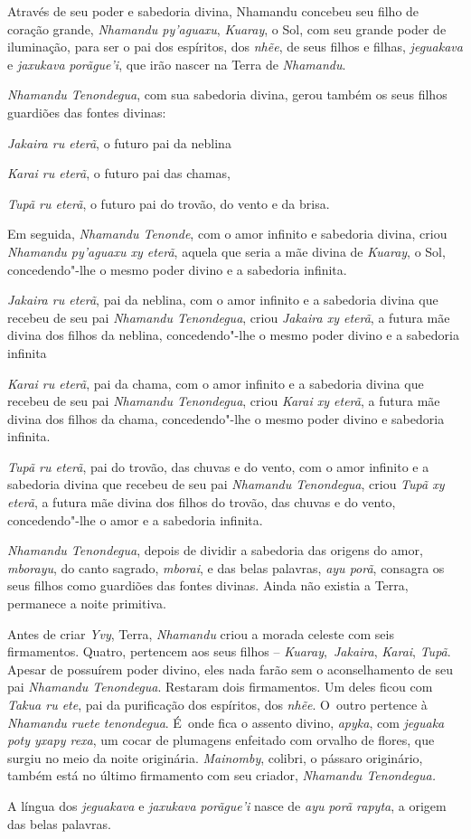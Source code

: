  

 

Através de seu poder e sabedoria divina, Nhamandu concebeu seu filho de
coração grande, \emph{Nhamandu py'aguaxu}, \emph{Kuaray}, o Sol, com seu
grande poder de iluminação, para ser o pai dos espíritos, dos
\emph{nhẽe}, de seus filhos e filhas, \emph{jeguakava} e \emph{jaxukava}
\emph{porãgue'i}, que irão nascer na Terra de \emph{Nhamandu}.

\emph{Nhamandu Tenondegua}, com sua sabedoria divina, gerou também os
seus filhos guardiões das fontes divinas:

\emph{Jakaira ru eterã}, o futuro pai da neblina

\emph{Karai ru eterã}, o futuro pai das chamas,

\emph{Tupã ru eterã}, o futuro pai do trovão, do vento e da brisa.

Em seguida, \emph{Nhamandu Tenonde}, com o amor infinito e sabedoria
divina, criou \emph{Nhamandu py'aguaxu xy eterã}, aquela que seria a mãe
divina de \emph{Kuaray}, o Sol, concedendo"-lhe o mesmo poder divino e a
sabedoria infinita.

\emph{Jakaira ru eterã}, pai da neblina, com o amor infinito e a
sabedoria divina que recebeu de seu pai \emph{Nhamandu Tenondegua},
criou \emph{Jakaira xy eterã}, a futura mãe divina dos filhos da
neblina, concedendo"-lhe o mesmo poder divino e a sabedoria infinita

\emph{Karai ru eterã}, pai da chama, com o amor infinito e a sabedoria
divina que recebeu de seu pai \emph{Nhamandu Tenondegua}, criou
\emph{Karai xy eterã}, a futura mãe divina dos filhos da chama,
concedendo"-lhe o mesmo poder divino e sabedoria infinita.

\emph{Tupã ru eterã}, pai do trovão, das chuvas e do vento, com o amor
infinito e a sabedoria divina que recebeu de seu pai \emph{Nhamandu
Tenondegua}, criou \emph{Tupã xy eterã}, a futura mãe divina dos filhos
do trovão, das chuvas e do vento, concedendo"-lhe o amor e a sabedoria
infinita.

\emph{Nhamandu Tenondegua}, depois de dividir a sabedoria das origens do
amor, \emph{mborayu}, do canto sagrado, \emph{mborai}, e das belas
palavras, \emph{ayu porã}, consagra os seus filhos como guardiões das
fontes divinas. Ainda não existia a Terra, permanece a noite primitiva.

Antes de criar \emph{Yvy}, Terra, \emph{Nhamandu} criou a morada celeste
com seis firmamentos. Quatro, pertencem aos seus filhos --
\emph{Kuaray},~\emph{Jakaira}, \emph{Karai}, \emph{Tupã}. Apesar de
possuírem poder divino, eles nada farão sem o aconselhamento de seu pai
\emph{Nhamandu Tenondegua}. Restaram dois firmamentos. Um deles ficou
com \emph{Takua ru ete}, pai da purificação dos espíritos, dos
\emph{nhẽe}. O~outro pertence à \emph{Nhamandu ruete tenondegua}. É~onde
fica o assento divino, \emph{apyka}, com \emph{jeguaka poty yxapy rexa},
um cocar de plumagens enfeitado com orvalho de flores, que surgiu no
meio da noite originária. \emph{Mainomby}, colibri, o pássaro
originário, também está no último firmamento com seu criador,
\emph{Nhamandu Tenondegua.}~

A língua dos \emph{jeguakava} e \emph{jaxukava} \emph{porãgue'i} nasce
de \emph{ayu} \emph{porã rapyta}, a origem das belas palavras.


 
